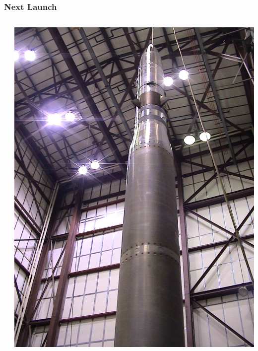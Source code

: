 \documentclass[landscape,xcolor={table}]{beamer}
\begin{document}
	\begin{frame}
		
		\frametitle{Next Launch}
		
		\begin{columns}[T] %
		\begin{column}{.49\textwidth}

			
			
		\end{column}%
		\hfill%
		\begin{column}{.49\textwidth}

			\includegraphics[width=\textwidth]{images/high}
					
		\end{column}%
		\end{columns}

	\end{frame}
	
\end{document}

